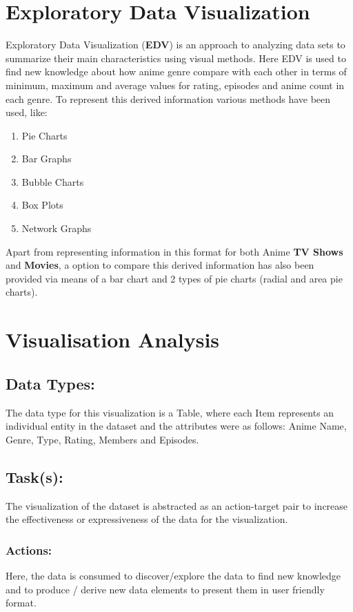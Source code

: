 \documentclass[a4paper, 10pt]{article}
\begin{document}
\section{Exploratory Data Visualization}
    \qquad Exploratory Data Visualization (\textbf{EDV}) is an approach to analyzing data sets to summarize their main characteristics using visual methods. Here EDV is used to find new knowledge about how anime genre compare with each other in terms of minimum, maximum and average values for rating, episodes and anime count in each genre. To represent this derived information various methods have been used, like:
    \begin{enumerate}
        \item Pie Charts
        \item Bar Graphs
        \item Bubble Charts \cite{bubble-chart}
        \item Box Plots \cite{box-plot}
        \item Network Graphs
    \end{enumerate}
    \qquad Apart from representing information in this format for both Anime \textbf{TV Shows} and \textbf{Movies}, a option to compare this derived information has also been provided via means of a bar chart and 2 types of pie charts (radial and area pie charts).
    
\section{Visualisation Analysis}
    \subsection{Data Types:}
    \qquad The data type for this visualization is a Table, where each Item represents an individual entity in the dataset and the attributes were as follows: Anime Name, Genre, Type, Rating, Members and Episodes.
    
    \subsection{Task(s):}
    \qquad The visualization of the dataset is abstracted as an action-target pair to increase the effectiveness or expressiveness of the data for the visualization.
    \subsubsection{Actions:}
    \qquad Here, the data is consumed to discover/explore the data to find new knowledge and to produce / derive new data elements to present them in user friendly format.
\end{document}

